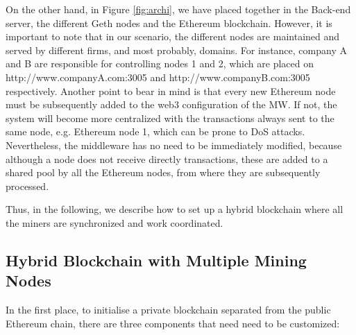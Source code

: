 On the other hand, in Figure \ref{fig:archi}, we have placed together in the Back-end server, the different Geth nodes and the Ethereum blockchain. However, it is important to note that in our scenario, the different nodes are maintained and served by different firms, and most probably, domains. For instance, company A and B are responsible for controlling nodes 1 and 2, which are placed on http://www.companyA.com:3005 and http://www.companyB.com:3005 respectively. Another point to bear in mind is that every new Ethereum node must be subsequently added to the web3 configuration of the MW. If not, the system will become more centralized with the transactions always sent to the same node, e.g. Ethereum node 1, which can be prone to DoS attacks. Nevertheless, the middleware has no need to be immediately modified, because although a node does not receive directly transactions, these are added to a shared pool by all the Ethereum nodes, from where they are subsequently processed.

Thus, in the following, we describe how to set up a hybrid blockchain where all the miners are synchronized and work coordinated.

\subsection{Hybrid Blockchain with Multiple Mining Nodes} \label{privateNw}

In the first place, to initialise a private blockchain separated from the public Ethereum chain, there are three components that need need to be customized:

